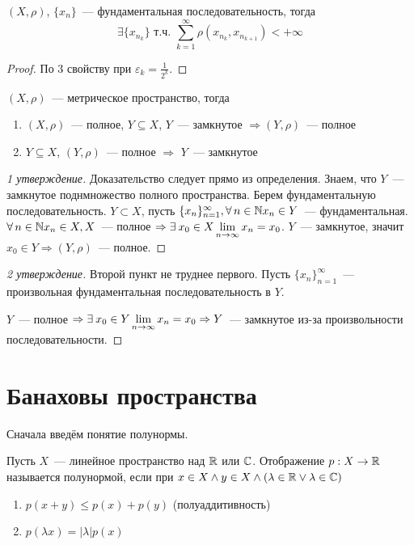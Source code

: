 \documentclass[document]{subfiles}
\begin{document}
\begin{corollary}
\label{cor:subseq-metric-sum-converges}
    $(X, \rho)$, $\{x_n\}$~--- фундаментальная последовательность, тогда 
    \[ \exists \{x_{n_k} \} \text { т.ч. } \sum_{k=1}^\infty \rho(x_{n_k}, x_{n_{k+1}}) < + \infty \]
\end{corollary}
\begin{proof}
    По 3 свойству при $\varepsilon_k = \frac{1}{2^k}$.
\end{proof}

\begin{theorem}
    $(X,\rho)$~--- метрическое пространство, тогда
    \begin{enumerate}
        \item $(X, \rho)$~--- полное, $Y \subseteq X$, $Y$~--- замкнутое $\Rightarrow (Y, \rho)$~--- полное
        \item $Y \subseteq X$, $(Y,\rho)$~--- полное $\Rightarrow$ $Y$~--- замкнутое
    \end{enumerate}
\end{theorem}

\begin{proof}[1 утверждение]
        Доказательство следует прямо из определения. Знаем, что $Y$~--- замкнутое поднмножество полного пространства.
        Берем фундаментальную последовательность. $Y \subset X$, пусть $\{x_n\}^\infty_{n=1}, \forall n \in \bN x_n \in Y$~--- фундаментальная.
        $\forall n \in \bN x_n \in X, X$~--- полное $\Rightarrow \exists x_0 \in X \liml_{n \to \infty} x_n = x_0$. $Y$~--- замкнутое, значит $x_0 \in Y \Rightarrow (Y, \rho)$~--- полное.
\end{proof}
\begin{proof}[2 утверждение]
        Второй пункт не труднее первого. Пусть $\{x_n\}^\infty_{n=1}$~--- произвольная фундаментальная последовательность в $Y$.

        $Y$~--- полное $\Rightarrow \exists x_0 \in Y \liml_{n \to \infty} x_n = x_0 \Rightarrow Y$~--- замкнутое из-за произвольности последовательности.
\end{proof}

\section{Банаховы пространства}

Сначала введём понятие полунормы.
\begin{definition}[полунорма]
    Пусть $X$~--- линейное пространство над $\mathbb{R}$ или $\mathbb{C}$. Отображение $p: X \rightarrow \mathbb{R}$ называется полунормой, если при $x \in X \land y \in X \land (\lambda \in \mathbb{R} \lor \lambda \in \mathbb{C})$
    \begin{enumerate}
        \item $p(x + y) \leq p(x) + p(y)$ (полуаддитивность)
        \item $p(\lambda x) = |\lambda| p(x)$
    \end{enumerate} 
\end{definition}
\end{document}
